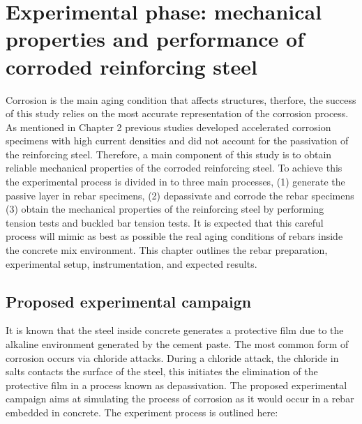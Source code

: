 \chapter{Experimental phase: mechanical properties and performance of corroded reinforcing steel}
\label{chap-three}

Corrosion is the main aging condition that affects structures, therfore, the success of this study relies on the most accurate representation of the corrosion process. As mentioned in Chapter 2 previous studies developed accelerated corrosion specimens with high current densities and did not account for the passivation of the reinforcing steel. Therefore, a main component of this study is to obtain reliable mechanical properties of the corroded reinforcing steel. To achieve this the experimental process is divided in to three main processes, (1) generate the passive layer in rebar specimens, (2) depassivate and corrode the rebar specimens (3) obtain the mechanical properties of the reinforcing steel by performing tension tests and buckled bar tension tests. It is expected that this careful process will mimic as best as possible the real aging conditions of rebars inside the concrete mix environment. This chapter outlines the rebar preparation, experimental setup, instrumentation, and expected results.

\section{Proposed experimental campaign}

It is known that the steel inside concrete generates a protective film due to the alkaline environment generated by the cement paste. The most common form of corrosion occurs via chloride attacks. During a chloride attack, the chloride in salts contacts the surface of the steel, this initiates the elimination of the protective film in a process known as depassivation. The proposed experimental campaign aims at simulating the process of corrosion as it would occur in a rebar embedded in concrete. The experiment process is outlined here:

